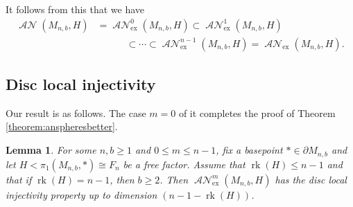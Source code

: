 \documentclass[11pt]{amsart}
\numberwithin{equation}{section}
\theoremstyle{plain}
\newtheorem{lemma}[theorem]{Lemma}
\theoremstyle{definition}
\theoremstyle{remark}
\DeclareMathOperator{\rank}{rk}
\DeclareMathOperator{\ANSpheres}{\mathcal{AN}}
\newcommand\ANSpheresEX{\ANSpheres_{\text{ex}}}
\begin{document}
It follows from this that we have
\begin{align*}
\ANSpheres(M_{n,b},H) &= \ANSpheresEX^0(M_{n,b},H) \subset \ANSpheresEX^1(M_{n,b},H) \\
                      &\quad \quad \quad \subset \cdots \subset \ANSpheresEX^{n-1}(M_{n,b},H) = \ANSpheresEX(M_{n,b},H).
\end{align*}

\subsection{Disc local injectivity}
Our result is as follows.  The case $m=0$ of it completes the proof of Theorem \ref{theorem:anspheresbetter}.

\begin{lemma}
\label{lemma:augdisc}
For some $n,b \geq 1$ and $0 \leq m \leq n-1$, fix a basepoint $\ast \in \partial M_{n,b}$
and let $H < \pi_1(M_{n,b},\ast) \cong F_n$ be a free factor.  Assume
that $\rank(H) \leq n-1$ and that if $\rank(H) = n-1$, then $b \geq 2$.
Then $\ANSpheresEX^m(M_{n,b},H)$ has
the disc local injectivity property up to dimension $(n-1-\rank(H))$.
\end{lemma}
\end{document}
